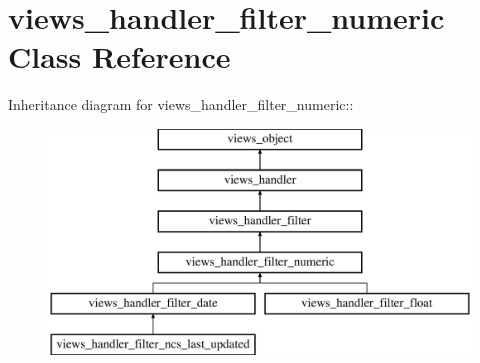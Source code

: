 \hypertarget{classviews__handler__filter__numeric}{
\section{views\_\-handler\_\-filter\_\-numeric Class Reference}
\label{classviews__handler__filter__numeric}
}
Inheritance diagram for views\_\-handler\_\-filter\_\-numeric::\begin{figure}[H]
\begin{center}
\leavevmode
\includegraphics[height=6cm]{classviews__handler__filter__numeric}
\end{center}
\end{figure}
